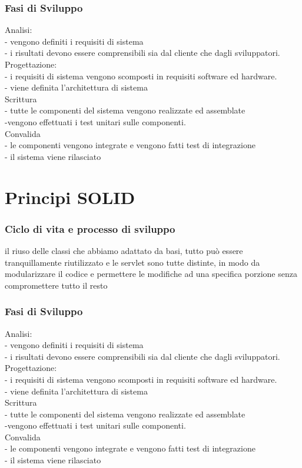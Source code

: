 \documentclass[a4paper,12pt]{beamer}
\begin{document}
\begin{frame}
\frametitle{Fasi di Sviluppo}
Analisi:\\
- vengono definiti i requisiti di sistema\\
- i risultati devono essere comprensibili sia dal cliente che dagli sviluppatori.\\
Progettazione:\\
- i requisiti di sistema vengono scomposti in requisiti software ed hardware.\\
- viene definita l’architettura di sistema\\
Scrittura \\
- tutte le componenti del sistema vengono realizzate ed assemblate  \\
-vengono effettuati i test unitari sulle componenti.\\
Convalida\\
- le componenti vengono integrate e vengono fatti test di integrazione\\
- il sistema viene rilasciato\\
\end{frame}

\pagebreak

\section{Principi SOLID}
\begin{frame}
\frametitle{Ciclo di vita e processo di sviluppo}
il riuso delle classi che abbiamo adattato da basi, tutto può essere tranquillamente riutilizzato e le servlet sono tutte distinte, in modo da modularizzare il codice e permettere le modifiche ad una specifica porzione senza compromettere tutto il resto
\end{frame}

\begin{frame}
\frametitle{Fasi di Sviluppo}
Analisi:\\
- vengono definiti i requisiti di sistema\\
- i risultati devono essere comprensibili sia dal cliente che dagli sviluppatori.\\
Progettazione:\\
- i requisiti di sistema vengono scomposti in requisiti software ed hardware.\\
- viene definita l’architettura di sistema\\
Scrittura \\
- tutte le componenti del sistema vengono realizzate ed assemblate  \\
-vengono effettuati i test unitari sulle componenti.\\
Convalida\\
- le componenti vengono integrate e vengono fatti test di integrazione\\
- il sistema viene rilasciato\\
\end{frame}
\end{document}
